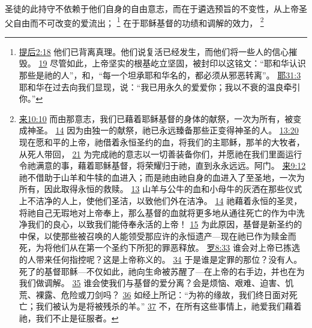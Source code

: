\documentclass[12pt, a4paper, oneside]{ctexart}
\newcounter{parnum}[section]
\newcommand{\N}{%
   \noindent\refstepcounter{parnum}%
    \makebox[\parindent][l]{\textbf{\arabic{parnum}.}}}
\begin{document}
\N 圣徒的此持守不依赖于他们自身的自由意志，而在于遴选预旨的不变性，从上帝圣父自由而不可改变的爱流出；
	\footnote {
		\href{https://biblehub.com/2_timothy/2-18.htm}{提后2:18} 他们已背离真理。他们说复活已经发生，而他们将一些人的信心摧毁。
		\href{https://biblehub.com/2_timothy/2-19.htm}{19} 尽管如此，上帝坚实的根基屹立坚固，被封印以这铭文：“耶和华认识那些是祂的人”，和，“每一个坦承耶和华名的，都必须从邪恶转离”。
		\href{https://biblehub.com/jeremiah/31-3.htm}{耶31:3} 耶和华在过去向我们显现，说：“我已用永久的爱爱你；我以不衰的温良牵引你。”
	}
	在于耶稣基督的功绩和调解的效力，
	\footnote {
		\href{https://biblehub.com/hebrews/10-10.htm}{来10:10} 而由那意志，我们已藉着耶稣基督的身体的献祭，一次为所有，被变成神圣。
		\href{https://biblehub.com/hebrews/10-14.htm}{14} 因为由独一的献祭，祂已永远臻备那些正变得神圣的人。
		\href{https://biblehub.com/hebrews/13-20.htm}{13:20} 现在愿和平的上帝，祂借着永恒圣约的血，将我们的主耶稣，那羊的大牧者，从死人带回，
		\href{https://biblehub.com/hebrews/13-21.htm}{21} 为完成祂的意志以一切善装备你们，并愿祂在我们里面运行令祂满意的事，藉着耶稣基督，将荣耀归于祂，直到永永远远。阿门。
		\href{https://biblehub.com/hebrews/9-12.htm}{来9:12} 祂不借助于山羊和牛犊的血进入；而是祂由祂自身的血进入了至圣地，一次为所有，因此取得永恒的救赎。
		\href{https://biblehub.com/hebrews/9-13.htm}{13} 山羊与公牛的血和小母牛的灰洒在那些仪式上不洁净的人上，使他们圣洁，以致他们外在洁净。
		\href{https://biblehub.com/hebrews/9-14.htm}{14} 祂藉着永恒的圣灵，将祂自己无瑕地对上帝奉上，那么基督的血就将更多地从通往死亡的作为中洗净我们的良心，以致我们能侍奉永活的上帝！
		\href{https://biblehub.com/hebrews/9-15.htm}{15} 为此原因，基督是新圣约的中保，以使那些被召唤的人能领受那应许的永恒遗产---现在祂已作为赎金而死，为将他们从在第一个圣约下所犯的罪恶释放。
		\href{https://biblehub.com/romans/8-33.htm}{罗8:33} 谁会对上帝已拣选的人带来任何指控呢？这是上帝称义的。
		\href{https://biblehub.com/romans/8-34.htm}{34} 于是谁是定罪的那位？没有人。死了的基督耶稣---不仅如此，祂向生命被苏醒了---在上帝的右手边，并也在为我们做调解。
		\href{https://biblehub.com/romans/8-35.htm}{35} 谁会使我们与基督的爱分离？会是烦恼、艰难、迫害、饥荒、裸露、危险或刀剑吗？
		\href{https://biblehub.com/romans/8-36.htm}{36} 如经上所记：“为祢的缘故，我们终日面对死亡；我们被认为是将被残杀的羊。”
		\href{https://biblehub.com/romans/8-37.htm}{37} 不，在所有这些事情上，祂爱我们藉着祂，我们不止是征服者。
}
\end{document}
